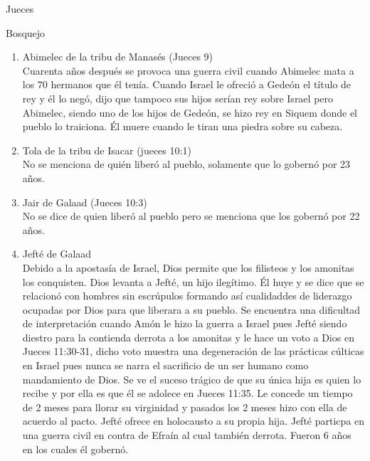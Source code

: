 \begin{section}{Jueces}
\begin{subsection}{Bosquejo}
\begin{enumerate}
\begin{enumerate}
							Lo tratan de matar pero él se levanta junto con varios hombres en contra de sus opresores tal y como se narra en Jueces 6:34.\\
En Jueces 6:37 Gedeón pusó una lana de oveja en el campo con el propósito de pedir señal que en la mañana la lana estuviera mojada pero campo seco. Dios hizo la señal tal y como Gedeón pidió, sin embargo, Gedeón volvió a pedir señal del llamado de Dios pidiéndole que ahora la lana estuviera seca mientras que el suelo estuviera mojado, en ambas ocasiones Dios le concede las pruebas que él pedía. En el capítulo 7 Dios le da una señal extra de que Él era quien iba a ganar la batalla pues Él le reduce el ejército a 300 hombres para librar a Israel.\\
Dios confunde al ejército enemigo para que se ataquen entre ellos y así obtienen la victoria sin ocupar a los 300 hombres. Entonces Israel quiere hacer rey a Gedeón pero él se niega pues Dios es el rey de Israel. Se narra que muere y que tuvo 30 hijos.
\item Abimelec de la tribu de Manasés (Jueces 9)\\
	Cuarenta años después se provoca una guerra civil cuando Abimelec mata a los 70 hermanos que él tenía. Cuando Israel le ofreció a Gedeón el título de rey y él lo negó, dijo que tampoco sus hijos serían rey sobre Israel pero Abimelec, siendo uno de los hijos de Gedeón, se hizo rey en Siquem donde el pueblo lo traiciona. Él muere cuando le tiran una piedra sobre su cabeza.
\item Tola de la tribu de Isacar (jueces 10:1)\\
No se menciona de quién liberó al pueblo, solamente que lo gobernó por 23 años.
\item Jair de Galaad (Jueces 10:3)\\
	No se dice de quien liberó al pueblo pero se menciona que los gobernó por 22 años.
\item Jefté de Galaad\\
	Debido a la apostasía de Israel, Dios permite que los filisteos y los amonitas los conquisten. Dios levanta a Jefté, un hijo ilegítimo. Él huye y se dice que se relacionó con hombres sin escrúpulos formando así cualidaddes de liderazgo ocupadas por Dios para que liberara a su pueblo.\newpage
	Se encuentra una dificultad de interpretación cuando Amón le hizo la guerra a Israel pues Jefté siendo diestro para la contienda derrota a los amonitas y le hace un voto a Dios en Jueces 11:30-31, dicho voto muestra una degeneración de las prácticas cúlticas en Israel pues nunca se narra el sacrificio de un ser humano como mandamiento de Dios. Se ve el suceso trágico de que su única hija es quien lo recibe y por ella es que él se adolece en Jueces 11:35. Le concede un tiempo de 2 meses para llorar su virginidad y pasados los 2 meses hizo con ella de acuerdo al pacto. Jefté ofrece en holocausto a su propia hija. Jefté particpa en una guerra civil en contra de Efraín al cual también derrota. Fueron 6 años en los cuales él gobernó.

\end{enumerate}
\end{enumerate}
\end{subsection}
\end{section}
